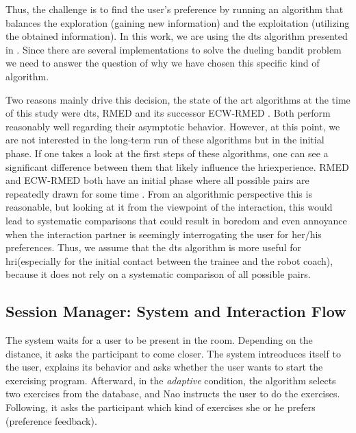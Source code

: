 \documentclass[twocolumn]{svjour3}          %
\begin{document}
Thus, the challenge is to find the user's preference by running an
algorithm that balances the exploration (gaining new information) and
the exploitation (utilizing the obtained information). In this work, we
are using the \gls{dts} algorithm presented in
\autocite{wu2016double}. Since there are several implementations to
solve the dueling bandit problem we need to answer the question of why
we have chosen this specific kind of algorithm.

Two reasons mainly drive this decision, the state of the art algorithms
at the time of this study were \gls{dts}, RMED and its successor ECW-RMED
\autocite{komiyama2015regret,komiyama2016copeland}. Both perform
reasonably well regarding their asymptotic behavior. However, at this
point, we are not interested in the long-term run of these algorithms
but in the initial phase. If one takes a look at the first steps of
these algorithms, one can see a significant difference between them that
likely influence the \gls{hri}experience. RMED and ECW-RMED both have an
initial phase where all possible pairs are repeatedly drawn for some
time \autocites{komiyama2015regret}[Algorithm 1]{komiyama2016copeland}.
From an algorithmic perspective this is reasonable, but looking at it
from the viewpoint of the interaction, this would lead to systematic
comparisons that could result in boredom and even annoyance when the
interaction partner is seemingly interrogating the user for her/his
preferences. Thus, we assume that the \gls{dts} algorithm is more useful for
\gls{hri}(especially for the initial contact between the trainee and the
robot coach), because it does not rely on a systematic comparison of all
possible pairs.

\hypertarget{session-manager-system-and-interaction-flow}{%
\subsection{Session Manager: System and Interaction
Flow}\label{session-manager-system-and-interaction-flow}}

The system waits for a user to be present in the room. Depending on the
distance, it asks the participant to come closer. The system intreoduces
itself to the user, explains its behavior and asks whether the user
wants to start the exercising program. Afterward, in the \textit{adaptive}
condition, the algorithm selects two exercises from the database, and
Nao instructs the user to do the exercises. Following, it asks the
participant which kind of exercises she or he prefers (preference
feedback).
\end{document}
